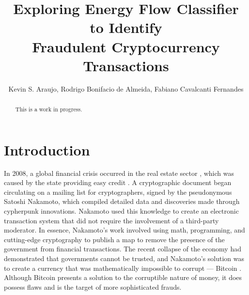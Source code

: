 \documentclass[12pt]{article}
\title{Exploring Energy Flow Classifier to Identify \\ Fraudulent Cryptocurrency Transactions}
\author{Kevin S. Araujo\inst{1}, Rodrigo Bonifacio de Almeida\inst{1}, 
  Fabiano Cavalcanti Fernandes\inst{2} }
\begin{document}
 

\maketitle

\begin{abstract}
  This is a work in progress.
\end{abstract}

\section{Introduction} \label{sec:introduction}

In 2008, a global financial crisis occurred in the real estate sector \cite{bordo2008historical}, which was caused by
the state providing easy credit \cite{murphy2008analysis}. A cryptographic document began circulating on a mailing list
for cryptographers, signed by the pseudonymous Satoshi Nakamoto, which compiled detailed data and discoveries made
through cypherpunk innovations. Nakamoto used this knowledge to create an electronic transaction system that did not
require the involvement of a third-party moderator. In essence, Nakamoto's work involved using math, programming, and
cutting-edge cryptography to publish a map to remove the presence of the government from financial transactions. The recent
collapse of the economy had demonstrated that governments cannot be trusted, and Nakamoto's solution was to create a
currency that was mathematically impossible to corrupt --- Bitcoin \cite{nakamoto2008bitcoin}. Although Bitcoin presents
a solution to the corruptible nature of money, it does possess flaws and is the target of more sophisticated frauds.
\end{document}
